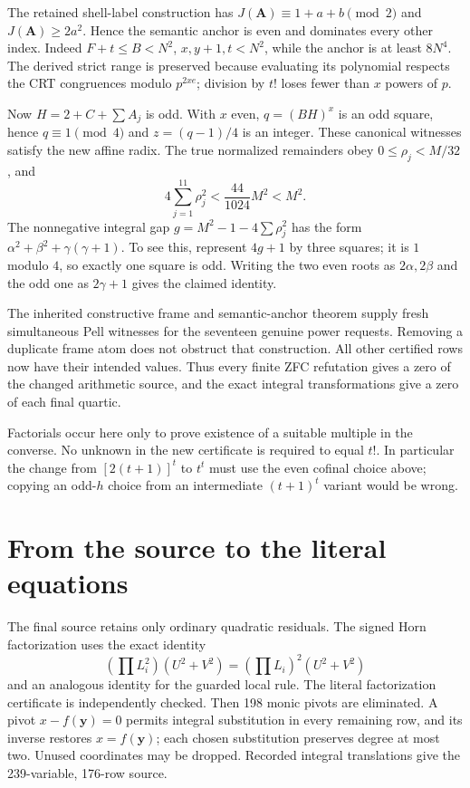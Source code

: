 \documentclass[11pt]{article}
\theoremstyle{definition}
\begin{document}
The retained shell-label construction has
$J(\boldsymbol A)\equiv1+a+b\pmod2$ and
$J(\boldsymbol A)\ge2a^2$. Hence the semantic anchor is even
and dominates every other index. Indeed
$F+t\le B<N^2$, $x,y+1,t<N^2$, while the anchor is at least
$8N^4$. The derived strict range is preserved because evaluating
its polynomial respects the CRT congruences modulo $p^{2xe}$;
division by $t!$ loses fewer than $x$ powers of $p$.

Now $H=2+C+\sum A_j$ is odd. With $x$ even,
$q=(BH)^x$ is an odd square, hence $q\equiv1\pmod4$ and
$z=(q-1)/4$ is an integer. These canonical witnesses satisfy the
new affine radix. The true normalized remainders obey
$0\le\rho_j<M/32$, and
\[
4\sum_{j=1}^{11}\rho_j^2<\frac{44}{1024}M^2<M^2.
\]
The nonnegative integral gap $g=M^2-1-4\sum\rho_j^2$ has the
form $\alpha^2+\beta^2+\gamma(\gamma+1)$. To see this, represent
$4g+1$ by three squares; it is $1$ modulo $4$, so exactly one
square is odd. Writing the two even roots as $2\alpha,2\beta$
and the odd one as $2\gamma+1$ gives the claimed identity.

The inherited constructive frame and semantic-anchor theorem supply
fresh simultaneous Pell witnesses for the seventeen genuine power
requests. Removing a duplicate frame atom does not obstruct that
construction. All other certified rows now have their intended
values. Thus every finite ZFC refutation gives a zero of the changed
arithmetic source, and the exact integral transformations give a zero
of each final quartic.

Factorials occur here only to prove existence of a suitable multiple
in the converse. No unknown in the new certificate is required to
equal $t!$. In particular the change from $[2(t+1)]^t$ to $t^t$
must use the even cofinal choice above; copying an odd-$h$ choice
from an intermediate $(t+1)^t$ variant would be wrong.

\section{From the source to the literal equations}
\label{sec:finite}

The final source retains only ordinary quadratic residuals. The
signed Horn factorization uses the exact identity
\[
\left(\prod L_i^2\right)(U^2+V^2)
=\left(\prod L_i\right)^2(U^2+V^2)
\]
and an analogous identity for the guarded local rule. The literal
factorization certificate is independently checked. Then 198 monic
pivots are eliminated. A pivot $x-f(\boldsymbol y)=0$ permits
integral substitution in every remaining row, and its inverse
restores $x=f(\boldsymbol y)$; each chosen substitution preserves
degree at most two. Unused coordinates may be dropped. Recorded
integral translations give the 239-variable, 176-row source.
\end{document}
